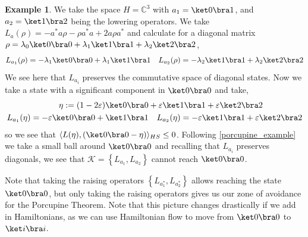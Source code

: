 \documentclass[11pt,reqno]{amsart}
\theoremstyle{definition}
\newtheorem{example}[theorem]{Example}
\newcommand{\mb}{\mathbb}
\newcommand{\mc}{\mathcal}
\newcommand{\lset}{\left\{ }
\newcommand{\rset}{\right\} }
\begin{document}
\begin{example}\label{Noise}
    We take the space $H = \mb C^3$ with $a_1 = \ket 0 \bra 1$, and $a_2 = \ket 1 \bra 2$ being the lowering operators. We take $L_a(\rho) = - a^* a \rho - \rho a^* a + 2 a \rho a^*$ and calculate for a diagonal matrix $\rho =\lambda_0 \ket 0 \bra 0 + \lambda_1 \ket 1 \bra 1 + \lambda_2 \ket 2 \bra 2 $, $$L_{a_1}(\rho) = - \lambda_1 \ket 0 \bra 0 + \lambda_1 \ket 1 \bra 1 \quad L_{a_2}(\rho) = -\lambda_2 \ket 1 \bra 1 + \lambda_2 \ket 2 \bra 2$$   We see here that $L_{a_i}$ preserves the commutative space of diagonal states.  Now we take a state with a significant component in $\ket 0 \bra 0$ and take, \begin{align*} \eta := (1 - 2 \varepsilon) \ket 0  \bra 0 &  + \varepsilon  \ket 1 \bra 1 + \varepsilon \ket 2 \bra 2 \\ L_{a_1}(\eta) = -\varepsilon \ket 0 \bra 0 + \ket 1 \bra 1 & \quad L_{a_2}(\eta) = -\varepsilon \ket 1 \bra 1 + \varepsilon \ket 2 \bra 2 \end{align*} so we see that $\langle L(\eta), (\ket 0 \bra 0 - \eta) \rangle_{HS} \leq 0$. Following \cref{porcupine_example} we take a small ball around $\ket 0 \bra 0$ and recalling that $L_{a_i}$ preserves diagonals, we see that $\mc K = \lset L_{a_1}, L_{a_2} \rset $ cannot reach $\ket 0 \bra0$.

    Note that taking the raising operators $\lset L_{a^*_1}, L_{a^*_2}\rset $ allows reaching the state $\ket 0 \bra 0$, but only taking the raising operators gives us our zone of avoidance for the Porcupine Theorem. Note that this picture changes drastically if we add in Hamiltonians, as we can use Hamiltonian flow to move  from $ \ket 0  \bra 0$ to $\ket i \bra i$. 
\end{example}
\end{document}
